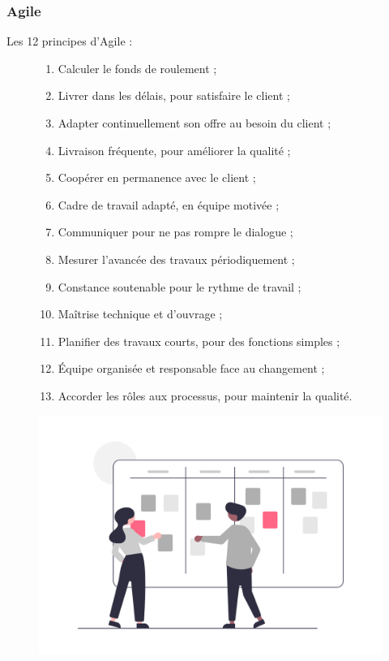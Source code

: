\documentclass[9pt]{beamer}
\begin{document}
\begin{frame}
	\frametitle{Agile}
	Les 12 principes d’Agile :
\begin{figure}[!htb]
   \begin{minipage}{0.7\textwidth}
     \centering
     \begin{enumerate}
  		\item Calculer le fonds de roulement ;
		\item Livrer dans les délais, pour satisfaire le client ;
		\item Adapter continuellement son offre au besoin du client ;
		\item Livraison fréquente, pour améliorer la qualité ;
		\item Coopérer en permanence avec le client ;
		\item Cadre de travail adapté, en équipe motivée ;
		\item Communiquer pour ne pas rompre le dialogue ;
		\item Mesurer l’avancée des travaux périodiquement ;
		\item Constance soutenable pour le rythme de travail ;
		\item Maîtrise technique et d’ouvrage ;
		\item Planifier des travaux courts, pour des fonctions simples ;
		\item Équipe organisée et responsable face au changement ;
		\item Accorder les rôles aux processus, pour maintenir la qualité.
	 \end{enumerate}	
   \end{minipage}\hfill
   \begin{minipage}{0.3\textwidth}
     \centering
     \includegraphics[width=1\linewidth]{../media/Scrum_board}
     \label{Fig:scrum_board}
   \end{minipage}
\end{figure}
\end{frame}
\end{document}
